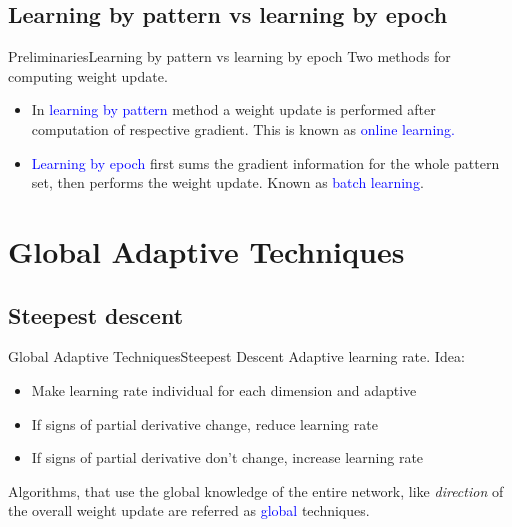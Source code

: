 \documentclass{beamer}
\begin{document}
\subsection{Learning by pattern vs learning by epoch}	
\begin{frame}{Preliminaries}{Learning by pattern vs learning by epoch}
Two methods for computing weight update. \\
\vspace{5mm}

\begin{itemize}
\item In \textcolor{blue}{learning by pattern} method a weight update is performed after computation of respective gradient. This is known as \textcolor{blue}{online learning.}

\item \textcolor{blue}{Learning by epoch} first sums the gradient information for the whole pattern set, then performs the weight update. Known as \textcolor{blue}{batch learning}.  
\end{itemize}

\end{frame}


\section{Global Adaptive Techniques}	
\subsection{Steepest descent}
\begin{frame}{Global Adaptive Techniques}{Steepest Descent}
Adaptive learning rate. 
\vspace{5mm}
\pause
Idea: 
\begin{itemize}
\item Make learning rate individual for each dimension and adaptive
\item If signs of partial derivative change, reduce learning rate
\item If signs of partial derivative don’t change, increase learning rate
\end{itemize}
\vspace{5mm}

Algorithms, that use the global knowledge of the entire network, like \textit{direction} of the overall weight update are referred as \textcolor{blue}{global} techniques.  

\end{frame}
\end{document}
